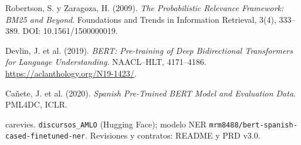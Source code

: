 \documentclass[10pt,a4paper]{article}
\begin{document}
\vspace{2pt}
{\fontsize{8.5}{10.5}\selectfont
\begin{enumerate}[leftmargin=13pt,label={[\arabic*]},itemsep=1pt,topsep=1pt]
\item Robertson, S. y Zaragoza, H. (2009). \emph{The Probabilistic Relevance Framework: BM25 and Beyond}. Foundations and Trends in Information Retrieval, 3(4), 333--389. DOI: 10.1561/1500000019.
\item Devlin, J. et al. (2019). \emph{BERT: Pre-training of Deep Bidirectional Transformers for Language Understanding}. NAACL--HLT, 4171--4186. \url{https://aclanthology.org/N19-1423/}.
\item Cañete, J. et al. (2020). \emph{Spanish Pre-Trained BERT Model and Evaluation Data}. PML4DC, ICLR.
\item carevies. \texttt{discursos\_AMLO} (Hugging Face); modelo NER \texttt{mrm8488/bert-spanish-cased-finetuned-ner}. Revisiones y contratos: README y PRD v3.0.
\end{enumerate}
}
\end{document}

